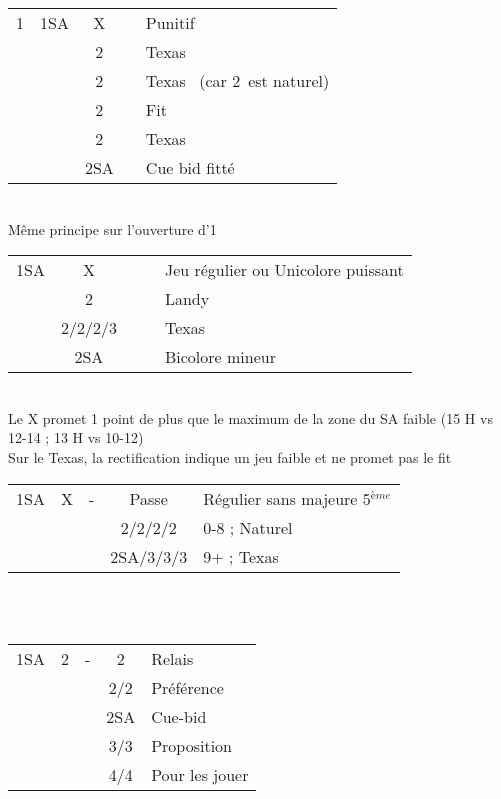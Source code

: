 \documentclass[a4paper, oneside, 11pt]{report}
\begin{document}
	\begin{tabular}{cccc|l}
	1\coeur & 1SA & X && Punitif\\
	&& 2\trefle && Texas \carreau\\
	&& 2\carreau && Texas \pique\ (car 2\coeur\ est naturel)\\
	&& 2\coeur && Fit\\
	&& 2\pique && Texas \trefle\\
	&& 2SA && Cue bid fitté\\
	\end{tabular}\\
	Même principe sur l'ouverture d'1\pique\\

	\begin{tabular}{cccc|l}
	1SA & X &&& Jeu régulier ou Unicolore puissant\\
	& 2\trefle &&& Landy\\
	& 2\carreau/2\coeur/2\pique/3\trefle &&& Texas\\
	& 2SA &&& Bicolore mineur\\
	\end{tabular}\\
	Le X promet 1 point de plus que le maximum de la zone du SA faible (15 H vs 12-14 ; 13 H vs 10-12)\\
	Sur le Texas, la rectification indique un jeu faible et ne promet pas le fit\\

	\begin{tabular}{cccc|l}
	1SA & X & - & Passe & Régulier sans majeure 5$^{ème}$\\
	&&& 2\trefle/2\carreau/2\coeur/2\pique & 0-8 ; Naturel\\
	&&& 2SA/3\trefle/3\carreau/3\coeur & 9+ ; Texas\\
	\end{tabular}\\\\

	\begin{tabular}{cccc|l}
	1SA & 2\trefle & - & 2\carreau & Relais\\
	&&& 2\coeur/2\pique & Préférence\\
	&&& 2SA & Cue-bid\\
	&&& 3\coeur/3\pique & Proposition\\
	&&& 4\coeur/4\pique & Pour les jouer\\
	\end{tabular}\\\\
\end{document}
